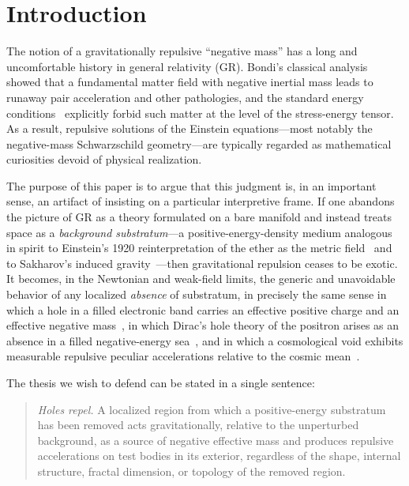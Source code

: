 \documentclass[%
  reprint,
  superscriptaddress,
  showpacs,
  showkeys,
  amsmath,amssymb,
  pra,
  longbibliography,
  floatfix,
  x11names
]{revtex4-2}
\begin{document}
\section{Introduction}
\label{sec:intro}

The notion of a gravitationally repulsive ``negative mass'' has a long and uncomfortable history in general relativity (GR). Bondi's classical analysis~\cite{bondi-1957} showed that a fundamental matter field with negative inertial mass leads to runaway pair acceleration and other pathologies, and the standard energy conditions~\cite{hawking-ellis,wald-1984} explicitly forbid such matter at the level of the stress-energy tensor. As a result, repulsive solutions of the Einstein equations---most notably the negative-mass Schwarzschild geometry---are typically regarded as mathematical curiosities devoid of physical realization.

The purpose of this paper is to argue that this judgment is, in an important sense, an artifact of insisting on a particular interpretive frame. If one abandons the picture of GR as a theory formulated on a bare manifold and instead treats space as a \emph{background substratum}---a positive-energy-density medium analogous in spirit to Einstein's 1920 reinterpretation of the ether as the metric field~\cite{einstein-aether-en} and to Sakharov's induced gravity~\cite{Sakharov-67}---then gravitational repulsion ceases to be exotic. It becomes, in the Newtonian and weak-field limits, the generic and unavoidable behavior of any localized \emph{absence} of substratum, in precisely the same sense in which a hole in a filled electronic band carries an effective positive charge and an effective negative mass~\cite{kittel-ssp,ashcroft-mermin}, in which Dirac's hole theory of the positron arises as an absence in a filled negative-energy sea~\cite{dirac-1930}, and in which a cosmological void exhibits measurable repulsive peculiar accelerations relative to the cosmic mean~\cite{shethvdw-2004,hamaus-2014}.

The thesis we wish to defend can be stated in a single sentence:

\begin{quote}
\emph{Holes repel.} A localized region from which a positive-energy substratum has been removed acts gravitationally, relative to the unperturbed background, as a source of negative effective mass and produces repulsive accelerations on test bodies in its exterior, regardless of the shape, internal structure, fractal dimension, or topology of the removed region.
\end{quote}
\end{document}
